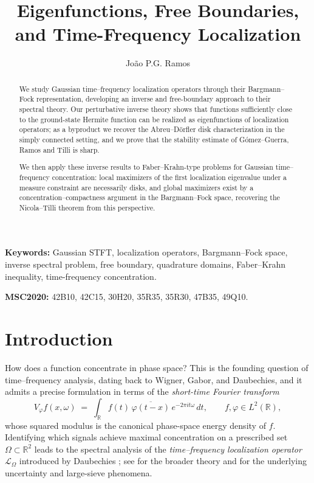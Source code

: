 \documentclass[a4paper,11pt,reqno]{amsart}
\title[Time-frequency localization]{Eigenfunctions, Free Boundaries, and Time-Frequency Localization}
\author{Jo{\~a}o P.G. Ramos}
\numberwithin{equation}{section}
\theoremstyle{plain} %
\theoremstyle{definition} %
\theoremstyle{remark}
\newcommand{\R}{\mathbb{R}}
\begin{document}
\maketitle 
\begin{abstract}
We study Gaussian time--frequency localization operators through their Bargmann--Fock representation, developing an inverse and free-boundary approach to their spectral theory. Our perturbative inverse theory shows that functions sufficiently close to the ground-state Hermite function can be realized as eigenfunctions of localization operators; as a byproduct we recover the Abreu--D\"orfler disk characterization in the simply connected setting, and we prove that the stability estimate of G\'omez--Guerra, Ramos and Tilli is sharp.

We then apply these inverse results to Faber--Krahn-type problems for Gaussian time--frequency concentration: local maximizers of the first localization eigenvalue under a measure constraint are necessarily disks, and global maximizers exist by a concentration--compactness argument in the Bargmann--Fock space, recovering the Nicola--Tilli theorem from this perspective.
\end{abstract}

\noindent\textbf{Keywords:} Gaussian STFT, localization operators, Bargmann--Fock space, inverse spectral problem, free boundary, quadrature domains, Faber--Krahn inequality, time-frequency concentration.

\medskip

\noindent\textbf{MSC2020:} 42B10, 42C15, 30H20, 35R35, 35R30, 47B35, 49Q10.



\section{Introduction}

How does a function concentrate in phase space? This is the founding question of time--frequency analysis, dating back to Wigner, Gabor, and Daubechies, and it admits a precise formulation in terms of the \emph{short-time Fourier transform}
\begin{equation}\label{eq:STFT-intro}
V_\varphi f(x,\omega) \;=\; \int_{\R} f(t)\,\overline{\varphi(t-x)}\,e^{-2\pi i t \omega}\,dt,
\qquad f,\varphi\in L^2(\R),
\end{equation}
whose squared modulus is the canonical phase-space energy density of $f$. Identifying which signals achieve maximal concentration on a prescribed set $\Omega\subset\R^2$ leads to the spectral analysis of the \emph{time--frequency localization operator} $\mathcal L_\Omega$ introduced by Daubechies \cite{Daubechies}; see \cite{Grochenig,Mallat,Folland,Daubechies-Paul,Ramanathan-Topiwala-Weyl,Ramanathan-Topiwala-Spectrogram,Cordero-Grochenig,Boggiatto-Cordero-Grochenig,Bayer-Grochenig,Kisil-CrossToeplitz,Nicola-Tilli-2,Ramos-time-frequency} for the broader theory and \cite{Lieb,abreu2021donoho} for the underlying uncertainty and large-sieve phenomena.
\end{document}
